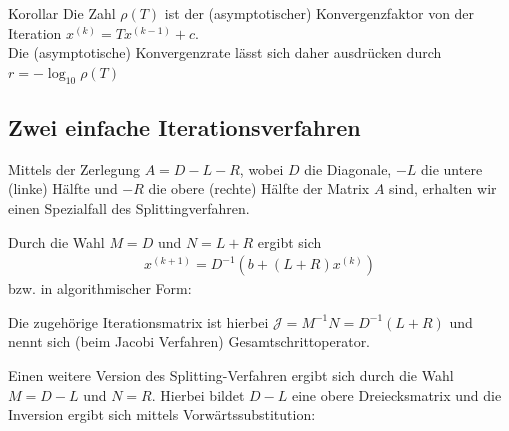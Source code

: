 \begin{colbox}{Korollar} 
  Die Zahl $\rho(T)$ ist der (asymptotischer) Konvergenzfaktor von der Iteration $x^{(k)}=Tx^{(k-1)}+c$. \\
  Die (asymptotische) Konvergenzrate lässt sich daher ausdrücken durch $r=-\log_{10}\rho(T)$
\end{colbox}

\subsection{Zwei einfache Iterationsverfahren}

Mittels der Zerlegung $A=D-L-R$, wobei $D$ die Diagonale, $-L$ die untere (linke) Hälfte 
und $-R$ die obere (rechte) Hälfte der Matrix $A$ sind, erhalten wir einen Spezialfall des Splittingverfahren. 

Durch die Wahl $M=D$ und $N=L+R$ ergibt sich 
%
\begin{align*}
  x^{(k+1)}=D^{-1}(b + (L+R)x^{(k)})
\end{align*}
%
bzw. in algorithmischer Form:


Die zugehörige Iterationsmatrix ist hierbei $\mathcal{J}=M^{-1}N = D^{-1}(L+R)$ 
und nennt sich (beim Jacobi Verfahren) Gesamtschrittoperator. 

Einen weitere Version des Splitting-Verfahren ergibt sich durch die Wahl $M=D-L$ und $N=R$.
Hierbei bildet $D-L$ eine obere Dreiecksmatrix und die Inversion ergibt sich mittels Vorwärtssubstitution: 


